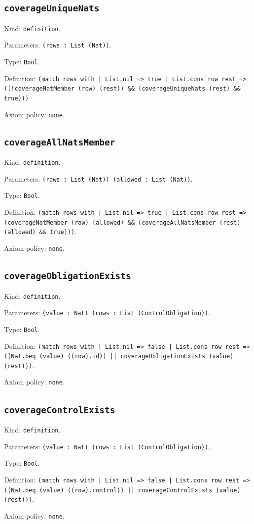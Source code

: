 \documentclass[11pt]{article}
\begin{document}
\subsection*{\texttt{coverageUniqueNats}}
\noindent Kind: \texttt{definition}.\par
\noindent Parameters: \texttt{(rows : List (Nat))}.\par
\noindent Type: \texttt{Bool}.\par
\noindent Definition: \texttt{(match rows with | List.nil => true | List.cons row rest => ((!coverageNatMember (row) (rest)) \&\& (coverageUniqueNats (rest) \&\& true)))}.\par
\noindent Axiom policy: \texttt{none}.\par
\subsection*{\texttt{coverageAllNatsMember}}
\noindent Kind: \texttt{definition}.\par
\noindent Parameters: \texttt{(rows : List (Nat)) (allowed : List (Nat))}.\par
\noindent Type: \texttt{Bool}.\par
\noindent Definition: \texttt{(match rows with | List.nil => true | List.cons row rest => (coverageNatMember (row) (allowed) \&\& (coverageAllNatsMember (rest) (allowed) \&\& true)))}.\par
\noindent Axiom policy: \texttt{none}.\par
\subsection*{\texttt{coverageObligationExists}}
\noindent Kind: \texttt{definition}.\par
\noindent Parameters: \texttt{(value : Nat) (rows : List (ControlObligation))}.\par
\noindent Type: \texttt{Bool}.\par
\noindent Definition: \texttt{(match rows with | List.nil => false | List.cons row rest => ((Nat.beq (value) ((row).id)) || coverageObligationExists (value) (rest)))}.\par
\noindent Axiom policy: \texttt{none}.\par
\subsection*{\texttt{coverageControlExists}}
\noindent Kind: \texttt{definition}.\par
\noindent Parameters: \texttt{(value : Nat) (rows : List (ControlObligation))}.\par
\noindent Type: \texttt{Bool}.\par
\noindent Definition: \texttt{(match rows with | List.nil => false | List.cons row rest => ((Nat.beq (value) ((row).control)) || coverageControlExists (value) (rest)))}.\par
\noindent Axiom policy: \texttt{none}.\par
\end{document}
